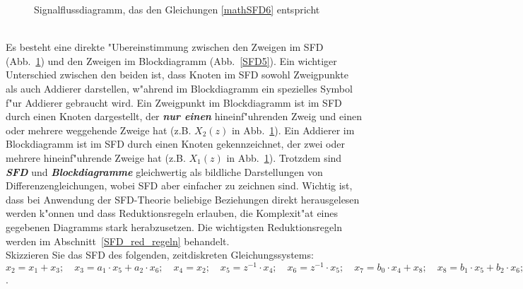 \begin{figure}[htb!]
\begin{center}
  \caption{Signalflussdiagramm, das den Gleichungen \ref{mathSFD6} entspricht}\label{SFD6}
\end{center}
\vspace*{-7mm}
\end{figure}\\
\nit Es besteht eine direkte "Ubereinstimmung zwischen den Zweigen im
SFD (Abb.~\ref{SFD6}) und den Zweigen im Blockdiagramm
(Abb.~\ref{SFD5}). Ein wichtiger Unterschied zwischen den beiden ist,
dass Knoten im SFD sowohl Zweigpunkte als auch Addierer darstellen,
w"ahrend im Blockdiagramm ein spezielles Symbol f"ur Addierer
gebraucht wird. Ein Zweigpunkt  im Blockdiagramm
ist im SFD durch einen Knoten dargestellt, der \textbf{\emph{nur
    einen}} hineinf"uhrenden Zweig und einen oder mehrere weggehende
Zweige hat (z.B. $X_2(z)$ in Abb.~\ref{SFD6}). Ein Addierer im
Blockdiagramm ist im SFD durch einen Knoten gekennzeichnet, der zwei
oder mehrere hineinf"uhrende Zweige hat (z.B. $X_1(z)$ in Abb.~\ref{SFD6}).  Trotzdem sind \textbf{\emph{SFD}}
und \textbf{\emph{Blockdiagramme}} gleichwertig als bildliche Darstellungen von
Differenzengleichungen, wobei SFD aber einfacher zu zeichnen sind. Wichtig
ist, dass bei Anwendung der SFD-Theorie beliebige Beziehungen direkt
herausgelesen werden k"onnen und dass Reduktionsregeln erlauben, die
Komplexit"at eines gegebenen Diagramms stark herabzusetzen. Die
wichtigsten Reduktionsregeln werden im Abschnitt~\ref{SFD_red_regeln} behandelt.\\
\aufg
Skizzieren Sie das SFD des folgenden, zeitdiskreten Gleichungssystems:\\
$x_2=x_1+x_3;\quad x_3=a_1\cdot x_5 + a_2\cdot x_6;\quad x_4=x_2;\quad
x_5=z^{-1}\cdot x_4;\quad x_6=z^{-1}\cdot x_5;\quad x_7=b_0\cdot x_4 +
x_8;\quad x_8=b_1\cdot x_5 + b_2\cdot x_6;\quad y=x_7$.


\newpage
